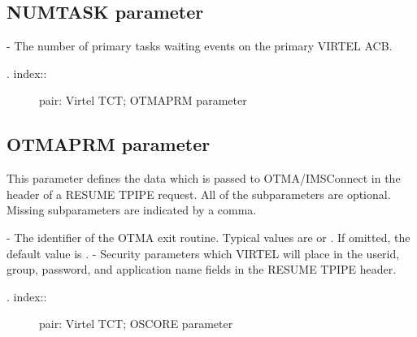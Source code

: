 \documentclass[letterpaper,10pt,english]{sphinxmanual}
\begin{document}
\subsection{NUMTASK parameter}
\label{\detokenize{Installation_Guide:numtask-parameter}}
\begin{sphinxVerbatim}[commandchars=\\\{\}]
 
\end{sphinxVerbatim}

 - The number of primary tasks waiting events on the primary VIRTEL ACB.
\begin{description}
\item[{. index::}] \leavevmode
pair: Virtel TCT; OTMAPRM parameter

\end{description}


\subsection{OTMAPRM parameter}
\label{\detokenize{Installation_Guide:otmaprm-parameter}}
\begin{sphinxVerbatim}[commandchars=\\\{\}]
 
\end{sphinxVerbatim}

This parameter defines the data which is passed to OTMA/IMSConnect in the header of a RESUME TPIPE request. All of the subparameters are optional. Missing subparameters are indicated by a comma.

 - The identifier of the OTMA exit routine. Typical values are  or . If omitted, the default value is .
 - Security parameters which VIRTEL will place in the userid, group, password, and application name fields in the RESUME TPIPE header.
\begin{description}
\item[{. index::}] \leavevmode
pair: Virtel TCT; OSCORE parameter

\end{description}
\end{document}
